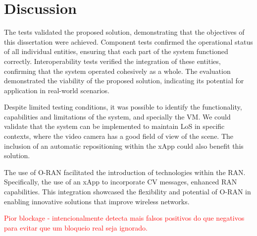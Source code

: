 


\section{Discussion}\label{sec:discuss}
The tests validated the proposed solution, demonstrating that the objectives of this dissertation were achieved.
Component tests confirmed the operational status of all individual entities, ensuring that each part of the system functioned correctly.
Interoperability tests verified the integration of these entities, confirming that the system operated cohesively as a whole.
The evaluation demonstrated the viability of the proposed solution, indicating its potential for application in real-world scenarios.

Despite limited testing conditions, it was possible to identify the functionality, capabilities and limitations of the system, and specially the VM\@.
We could validate that the system can be implemented to maintain LoS in specific contexts, where the video camera has a good field of view of the scene.
The inclusion of an automatic repositioning within the xApp could also benefit this solution.

The use of O-RAN facilitated the introduction of technologies within the RAN\@.
Specifically, the use of an xApp to incorporate CV messages, enhanced RAN capabilities.
This integration showcased the flexibility and potential of O-RAN in enabling innovative solutions that improve wireless networks.

\textcolor{red}{Pior blockage - intencionalmente detecta mais falsos positivos do que negativos para evitar que um bloqueio  real seja ignorado.}

